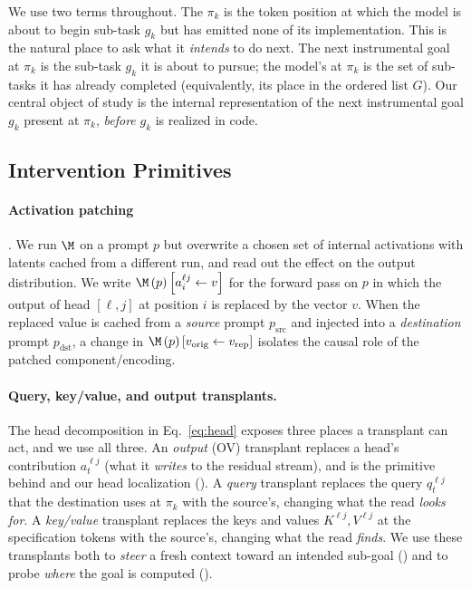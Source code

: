 We use two terms throughout. The \pivot $\pi_k$ is the token position at which the model is about to begin sub-task $g_k$ but has emitted none of its implementation. This is the natural place to ask what it \emph{intends} to do next. The next instrumental goal at $\pi_k$ is the sub-task $g_k$ it is about to pursue; the model's \progress at $\pi_k$ is the set of sub-tasks it has already completed (equivalently, its place in the ordered list $G$). Our central object of study is the internal representation of the next instrumental goal $g_k$ present at $\pi_k$, \emph{before} $g_k$ is realized in code.


\subsection{Intervention Primitives}
\label{sec:notations:interventions}
\paragraph{Activation patching} \citep{vig-etal-2020, mueller2026quest}. We run $\M$ on a prompt $p$ but overwrite a chosen set of internal activations with latents cached from a different run, and read out the effect on the output distribution. We write $\M\left(p\right)\left[a_i^{\ell j} \leftarrow v\right]$ for the forward pass on $p$ in which the output of head $[\ell,j]$ at position $i$ is replaced by the vector $v$. When the replaced value is cached from a \emph{source} prompt $p_{\text{src}}$ and injected into a \emph{destination} prompt $p_{\text{dst}}$, a change in $\M\left(p\right)\left[v_\mathrm{orig} \leftarrow v_\mathrm{rep}\right]$ isolates the causal role of the patched component/encoding. 

\paragraph{Query, key/value, and output transplants.} The head decomposition in Eq.~\ref{eq:head} exposes three places a transplant can act, and we use all three. An \emph{output} (OV) transplant replaces a head's contribution $a_t^{\ell j}$ (what it \emph{writes} to the residual stream), and is the primitive behind \goalscope and our head localization (). A \emph{query} transplant replaces the query $q_t^{\ell j}$ that the destination uses at $\pi_k$ with the source's, changing what the read \emph{looks for}. A \emph{key/value} transplant replaces the keys and values $K^{\ell j}, V^{\ell j}$ at the specification tokens with the source's, changing what the read \emph{finds}. We use these transplants both to \emph{steer} a fresh context toward an intended sub-goal () and to probe \emph{where} the goal is computed ().


